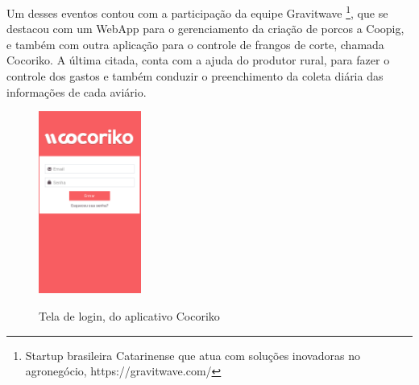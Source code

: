 Um desses eventos contou com a participação da equipe Gravitwave \footnote {Startup brasileira Catarinense que atua com soluções inovadoras no agronegócio, https://gravitwave.com/}, que se destacou com um WebApp para o gerenciamento da criação de porcos a Coopig, e também com outra aplicação para o controle de frangos de corte, chamada Cocoriko. A última citada, conta com a ajuda do produtor rural, para fazer o controle dos gastos e também conduzir o preenchimento da coleta diária das informações de cada aviário.

\begin{figure}[!h]
    \centering
    \caption{Tela de login, do aplicativo Cocoriko}
    \includegraphics[width=0.3\textwidth]{./dados/figuras/cocoriko.png}
    \label{fig:p1}
\end{figure}

